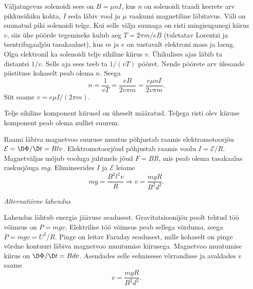 \documentclass[10pt, twoside]{article}
\begin{document}
{%

\solu
Väljatugevus solenoidi sees on $B=\mu nI$, kus $n$ on solenoidi traadi keerete arv pikkusühiku kohta, $I$ seda läbiv vool ja $\mu$ vaakumi magnetiline läbitavus. Väli on suunatud piki solenoidi telge. Kui selle välja suunaga on risti mingisugunegi kiirus $v$, siis ühe pöörde tegemiseks kulub aeg $T=2\pi m/eB$ (tuletatav Lorentzi ja tsentrifugaaljõu tasakaalust), kus $m$ ja $e$ on vastavalt elektroni mass ja laeng. Olgu elektronil ka solenoidi telje sihiline kiirus $v$. Ühikulises ajas läbib ta distantsi $1/v$. Selle aja sees teeb ta $1/(vT)$ pööret. Nende pöörete arv ülesande püstituse kohaselt peab olema $n$. Seega
\[
n=\frac{1}{vT}=\frac{eB}{2v\pi m}=\frac{e\mu nI}{2v\pi m}.
\]
Siit saame $v=e\mu I/(2\pi m)$.

Telje sihiline komponent kiirusel on üheselt määratud. Teljega risti olev kiiruse komponent peab olema nullist suurem.
\probend
\bigskip


\solu
Raami läbiva magnetvoo suuruse muutus põhjustab raamis elektromotoorjõu $\mathcal{E} = \D\Phi/\D t = Blv$. Elektromotoorjõud põhjustab raamis voolu $I = \mathcal{E}/R$. Magnetväljas mõjub vooluga juhtmele jõud $F = BIl$, mis peab olema tasakaalus raskusjõuga $mg$. Elimineerides $I$ ja $\mathcal{E}$ leiame
\[
m g=\frac{B^{2} l^{2} v}{R} \Rightarrow v=\frac{m g R}{B^{2} d^{2}}.
\]

\medskip

\emph{Alternatiivne lahendus}

Lahendus lähtub energia jäävuse seadusest. Gravitatsioonijõu poolt tehtud töö võimsus on $P = mgv$. Elektrilise töö võimsus peab sellega võrduma, seega $P = mgv = U^2/R$. Pinge on leitav Faraday seadusest, mille kohaselt on pinge võrdne kontuuri läbiva magnetvoo muutumise kiirusega. Magnetvoo muutumise kiirus on $\D\Phi/\D t = Bd v$. Asendades selle eelmisesse võrrandisse ja avaldades $v$ saame 
\[
v=\frac{m g R}{B^{2} d^{2}}.
\]
\probend
\bigskip


}
\end{document}
